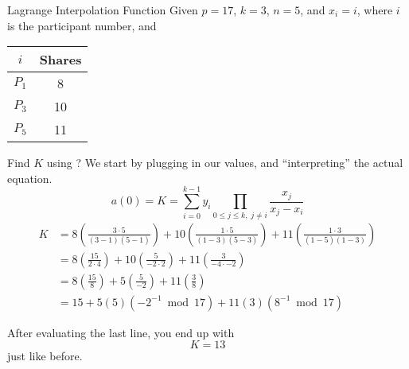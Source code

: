 \begin{example}{Lagrange Interpolation Function}
  Given $p=17$, $k=3$, $n=5$, and $x_{i} = i$, where $i$ is the participant number, and
  \begin{center}
    \begin{tabular}{c|c}
      \toprule
      $i$ & Shares \\
      \midrule
      $P_{1}$ & 8 \\
      $P_{3}$ & 10 \\
      $P_{5}$ & 11 \\
      \bottomrule
    \end{tabular}
  \end{center}

  Find $K$ using ?
  \tcblower{}
  We start by plugging in our values, and ``interpreting'' the actual equation.
  \begin{equation*}
    a(0) = K = \sum\limits_{i=0}^{k-1} y_{i} \prod\limits_{0 \leq j \leq k,\; j \neq i} \frac{x_{j}}{x_{j}-x_{i}}
  \end{equation*}
  \begin{align*}
    K &= 8 \left( \frac{3 \cdot 5}{(3-1)(5-1)} \right) + 10 \left( \frac{1 \cdot 5}{(1-3)(5-3)} \right) + 11 \left( \frac{1 \cdot 3}{(1-5)(1-3)} \right) \\
      &= 8 \left( \frac{15}{2 \cdot 4} \right) + 10 \left( \frac{5}{-2 \cdot 2} \right) + 11 \left( \frac{3}{-4 \cdot -2} \right) \\
      &= 8 \left( \frac{15}{8} \right) + 5 \left( \frac{5}{-2} \right) + 11 \left( \frac{3}{8} \right) \\
      &= 15 + 5 (5)(-2^{-1} \bmod 17) + 11(3)(8^{-1} \bmod 17)
  \end{align*}

  After evaluating the last line, you end up with
  \begin{equation*}
    K = 13
  \end{equation*}
  just like before.
\end{example}

